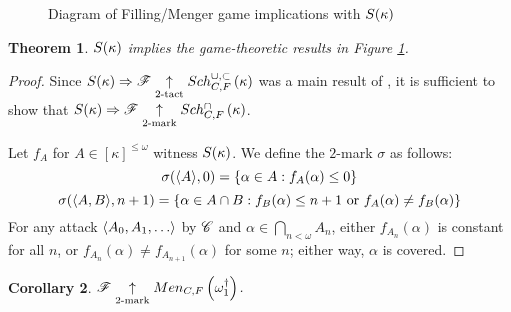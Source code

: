 \documentclass{amsart}
\newtheorem{theorem}{Theorem}[section]
\newtheorem{corollary}[theorem]{Corollary}
\theoremstyle{definition}
\begin{document}
\begin{figure}[h]
\begin{center}
\end{center}
\caption{Diagram of Filling/Menger game implications with \(S(\kappa)\)}
\label{fillingGamesDiagram2}
\end{figure}

\begin{theorem}
  \(S(\kappa)\) implies the game-theoretic results in
  Figure \ref{fillingGamesDiagram2}.
\end{theorem}

\begin{proof}
  Since \(S(\kappa)\Rightarrow\mathscr{F} \underset{2\text{-tact}}{\uparrow}Sch^{\cup,\subset}_{C,F}\left({\kappa}\right)\) was
  a main result of \cite{MR1129143}, it is sufficient to show that
  \(S(\kappa)\Rightarrow \mathscr{F} \underset{2\text{-mark}}{\uparrow}Sch^{\cap}_{C,F}\left({\kappa}\right)\).

  Let \(f_A\) for \(A\in[\kappa]^{\leq\omega}\) witness \(S(\kappa)\). We define
  the \(2\)-mark \(\sigma\) as follows:
    \[
      \sigma(\langle A\rangle,0) = \{\alpha\in A: f_A(\alpha) \leq 0 \}
    \]
    \[
      \sigma(\langle A,B\rangle,n+1)
        =
      \{
        \alpha \in A\cap B
      :
        f_B(\alpha) \leq n+1 \text{ or }
        f_A(\alpha)\not=f_B(\alpha)
      \}
    \]
  For any attack \(\<A_0,A_1,\dots\>\) by \(\mathscr{C}\) and
  \(\alpha\in\bigcap_{n<\omega}A_n\), either \(f_{A_n}(\alpha)\) is constant for
  all \(n\), or \(f_{A_n}(\alpha)\not=f_{A_{n+1}}(\alpha)\) for some \(n\);
  either way, \(\alpha\) is covered.
\end{proof}

\begin{corollary}
  \(\mathscr{F} \underset{2\text{-mark}}{\uparrow}Men_{C,F}\left({\omega^\dagger_1}\right)\).
\end{corollary}
\end{document}
